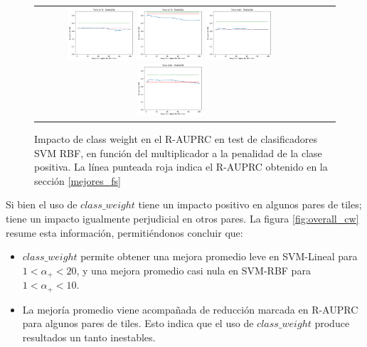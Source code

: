 \begin{figure}[h!]
\begin{tabular}{cccc}
\includegraphics[width=0.25\textwidth]{Kap7/cw/train=b278_test=b234_rbf_individual_curves.png}  \includegraphics[width=0.25\textwidth]{Kap7/cw/train=b278_test=b261_rbf_individual_curves.png} 
 \includegraphics[width=0.25\textwidth]{Kap7/cw/train=b360_test=b234_rbf_individual_curves.png}  \includegraphics[width=0.25\textwidth]{Kap7/cw/train=b360_test=b278_rbf_individual_curves.png} 
\end{tabular}
\caption{Impacto de class weight en el R-AUPRC en test de clasificadores SVM RBF, en función del multiplicador a la penalidad de la clase positiva. La línea punteada roja indica el R-AUPRC obtenido en la sección \protect\ref{mejores_fs}}
\label{fig:cw_k}
\end{figure}

Si bien el uso de $class\_weight$ tiene un impacto  positivo en algunos pares de tiles; tiene un impacto igualmente perjudicial en otros pares. La figura \ref{fig:overall_cw} resume esta información, permitiéndonos concluir que:

\begin{itemize}
\item $class\_weight$ permite obtener una mejora promedio leve en SVM-Lineal para $ 1 < \alpha_+ < 20$, y una mejora promedio casi nula en SVM-RBF para $1 < \alpha_+ < 10$.
\item La mejoría promedio viene acompañada de reducción marcada en R-AUPRC para algunos pares de tiles. Esto indica que el uso de $class\_weight$ produce resultados un tanto inestables.
\end{itemize}

